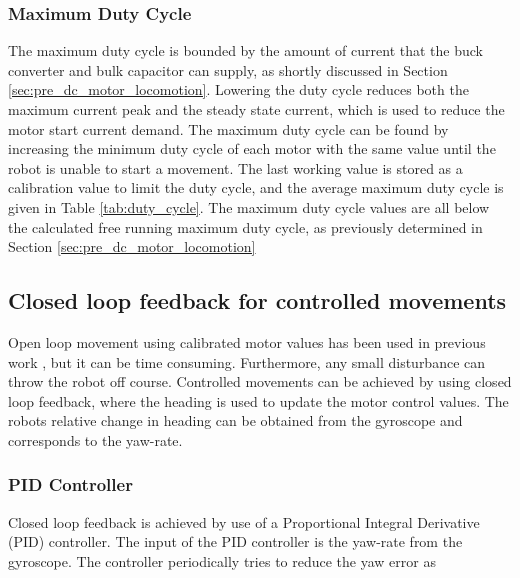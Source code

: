 \subsubsection{Maximum Duty Cycle}

The maximum duty cycle is bounded by the amount of current that the buck converter and bulk capacitor can supply, as shortly discussed in Section \ref{sec:pre_dc_motor_locomotion}.
Lowering the duty cycle reduces both the maximum current peak and the steady state current, which is used to reduce the motor start current demand.
The maximum duty cycle can be found by increasing the minimum duty cycle of each motor with the same value until the robot is unable to start a movement.
The last working value is stored as a calibration value to limit the duty cycle, and the average maximum duty cycle is given in Table \ref{tab:duty_cycle}.
The maximum duty cycle values are all below the calculated free running maximum duty cycle, as previously determined in Section \ref{sec:pre_dc_motor_locomotion}


\subsection{Closed loop feedback for controlled movements}

Open loop movement using calibrated motor values has been used in previous work \cite{legoc_uist_2016}, but it can be time consuming.
Furthermore, any small disturbance can throw the robot off course.
Controlled movements can be achieved by using closed loop feedback, where the heading is used to update the motor control values.
The robots relative change in heading can be obtained from the gyroscope and corresponds to the yaw-rate.

\subsubsection{PID Controller}


Closed loop feedback is achieved by use of a Proportional Integral Derivative (PID) controller.
The input of the PID controller is the yaw-rate from the gyroscope.
The controller periodically tries to reduce the yaw error as


